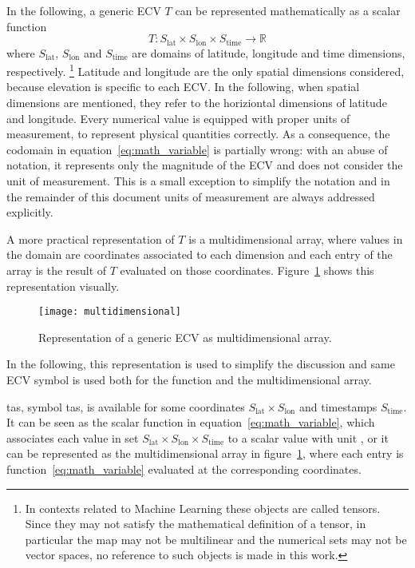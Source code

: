 In the following, a generic \gls{ECV} $T$ can be represented mathematically as a scalar function
\begin{equation}
  \label{eq:math_variable}
  T : S_\text{lat} \times S_\text{lon} \times S_\text{time} \to \mathbb{R}
\end{equation}
where $S_\text{lat}$, $S_\text{lon}$ and $S_\text{time}$ are domains of latitude, longitude and time dimensions, respectively.%
\footnote{In contexts related to Machine Learning these objects are called tensors. Since they may not satisfy the mathematical definition of a tensor, in particular the map may not be multilinear and the numerical sets may not be vector spaces, no reference to such objects is made in this work.}
Latitude and longitude are the only spatial dimensions considered, because elevation is specific to each \gls{ECV}. In the following, when spatial dimensions are mentioned, they refer to the horiziontal dimensions of latitude and longitude.
Every numerical value is equipped with proper units of measurement, to represent physical quantities correctly. As a consequence, the codomain in equation~\eqref{eq:math_variable} is partially wrong: with an abuse of notation, it represents only the magnitude of the \gls{ECV} and does not consider the unit of measurement. This is a small exception to simplify the notation and in the remainder of this document units of measurement are always addressed explicitly.

A more practical representation of $T$ is a multidimensional array, where values in the domain are coordinates associated to each dimension and each entry of the array is the result of $T$ evaluated on those coordinates. Figure~\ref{fig:multidimensional} shows this representation visually.
\begin{figure}[h]
  \centering
  \texttt{[image: multidimensional]}
  \caption{Representation of a generic \gls{ECV} as multidimensional array.}
  \label{fig:multidimensional}
\end{figure}
In the following, this representation is used to simplify the discussion and same \gls{ECV} symbol is used both for the function and the multidimensional array.
\begin{example}
  \Glsdesc{tas}, symbol \gls{tas}, is available for some coordinates $S_\text{lat} \times S_\text{lon}$ and timestamps $S_\text{time}$. It can be seen as the scalar function in equation~\eqref{eq:math_variable}, which associates each value in set $S_\text{lat} \times S_\text{lon} \times S_\text{time}$ to a scalar value with unit , or it can be represented as the multidimensional array in figure~\ref{fig:multidimensional}, where each entry is function~\eqref{eq:math_variable} evaluated at the corresponding coordinates.
\end{example}

